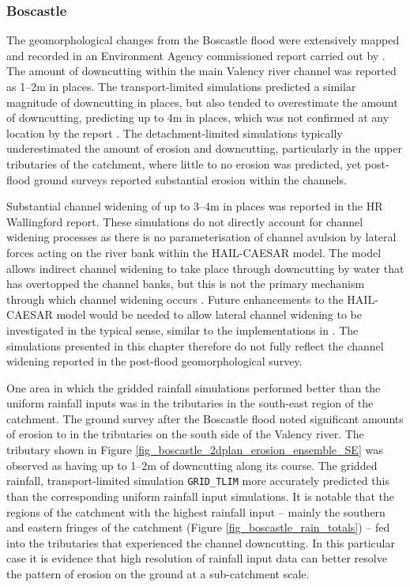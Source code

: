 \subsubsection{Boscastle}
The geomorphological changes from the Boscastle flood were extensively mapped and recorded in an Environment Agency commissioned report carried out by \citet{wallingford2005flooding}. The amount of downcutting within the main Valency river channel was reported as 1--2m in places. The transport-limited simulations predicted  a similar magnitude of downcutting in places, but also tended to overestimate the amount of downcutting, predicting up to 4m in places, which was not confirmed at any location by the \citet{wallingford2005flooding} report . The detachment-limited simulations typically underestimated the amount of erosion and downcutting, particularly in the upper tributaries of the catchment, where little to no erosion was predicted, yet post-flood ground surveys reported substantial erosion within the channels. 

Substantial channel widening of up to 3--4m in places was reported in the HR Wallingford report. These simulations do not directly account for channel widening processes as there is no parameterisation of channel avulsion by lateral forces acting on the river bank within the HAIL-CAESAR model. The model allows indirect channel widening to take place through downcutting by water that has overtopped the channel banks, but this is not the primary mechanism through which channel widening occurs \citep{parker1976cause}. Future enhancements to the HAIL-CAESAR model would be needed to allow lateral channel widening to be investigated in the typical sense, similar to the implementations in \citet{murray1997properties,Coulthard2013}. The simulations presented in this chapter therefore do not fully reflect the channel widening reported in the post-flood geomorphological survey.

One area in which the gridded rainfall simulations performed better than the uniform rainfall inputs was in the tributaries in the south-east region of the catchment. The ground survey after the Boscastle flood noted significant amounts of erosion to in the tributaries on the south side of the Valency river. The tributary shown in Figure \ref{fig_boscastle_2dplan_erosion_ensemble_SE} was observed as having up to 1--2m of downcutting along its course. The gridded rainfall, transport-limited simulation \texttt{GRID\_TLIM} more accurately predicted this than the corresponding uniform rainfall input simulations. It is notable that the regions of the catchment with the highest rainfall input -- mainly the southern and eastern fringes of the catchment (Figure \ref{fig_boscastle_rain_totals}) -- fed into the tributaries that experienced the channel downcutting. In this particular case it is evidence that high resolution of rainfall input data can better resolve the pattern of erosion on the ground at a sub-catchment scale.

